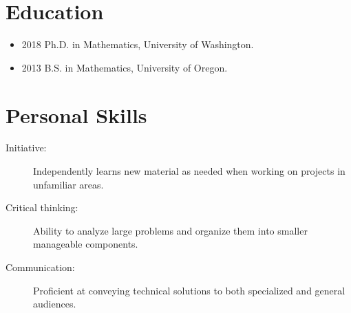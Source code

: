 \documentclass{article}
\begin{document}
	\section{Education}

	\begin{itemize}
		\item 2018 Ph.D. in Mathematics, University of Washington.
		\item 2013 B.S. in Mathematics, University of Oregon.
	\end{itemize}
	\section{Personal Skills}

	\begin{description}
		\item[Initiative:] Independently learns new material as needed when working on projects in unfamiliar areas.
		\item[Critical thinking:] Ability to analyze large problems and organize them into smaller manageable components.
		\item[Communication:] Proficient at conveying technical solutions to both specialized and general audiences.
	\end{description}
\end{document}
